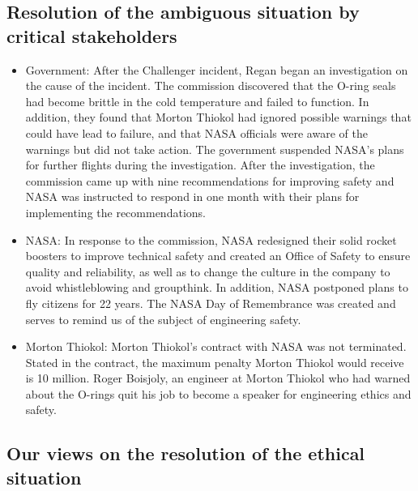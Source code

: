 \documentclass{article}
\begin{document}
\vspace{10pt}
\subsection{Resolution of the ambiguous situation by critical stakeholders}

\begin{itemize}

\item
Government:
After the Challenger incident, Regan began an investigation on the cause of the incident. The commission discovered that the O-ring seals had become brittle in the cold temperature and failed to function. In addition, they found that Morton Thiokol had ignored possible warnings that could have lead to failure, and that NASA officials were aware of the warnings but did not take action. The government suspended NASA's plans for further flights during the investigation. After the investigation, the commission came up with nine recommendations for improving safety and NASA was instructed to respond in one month with their plans for implementing the recommendations.

\item
NASA:
In response to the commission, NASA redesigned their solid rocket boosters to improve technical safety and created an Office of Safety to ensure quality and reliability, as well as to change the culture in the company to avoid whistleblowing and groupthink. In addition, NASA postponed plans to fly citizens for 22 years. The NASA Day of Remembrance was created and serves to remind us of the subject of engineering safety.

\item
Morton Thiokol:
Morton Thiokol's contract with NASA was not terminated. Stated in the contract, the maximum penalty Morton Thiokol would receive is 10 million.
Roger Boisjoly, an engineer at Morton Thiokol who had warned about the O-rings quit his job to become a speaker for engineering ethics and safety.
\end{itemize}

\vspace{10pt}
\subsection{Our views on the resolution of the ethical situation}
\end{document}
